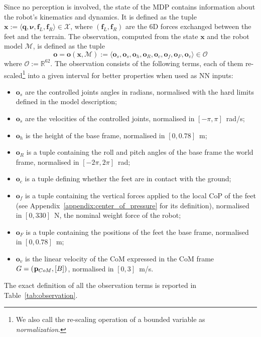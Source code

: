 Since no perception is involved, the state of the \ac{MDP} contains information about the robot's kinematics and dynamics.
It is defined as the tuple $\mathbf{x} := \langle \mathbf{q}, \mathbf{\boldsymbol{\nu}}, \mathbf{f}_L, \mathbf{f}_R \rangle \in \mathcal{X}$, where $(\mathbf{f}_L, \mathbf{f}_R)$ are the 6D forces exchanged between the feet and the terrain.
The observation, computed from the state $\mathbf{x}$ and the robot model $\mathcal{M}$, is defined as the tuple
%
\begin{equation*}
    \boldsymbol{o} =
    \boldsymbol{o}(\mathbf{x}, \mathcal{M}) :=
    \langle \mathbf{o}_s, \mathbf{o}_{\dot{s}}, \mathbf{o}_h, \mathbf{o}_R, \mathbf{o}_c, \mathbf{o}_f, \mathbf{o}_F, \mathbf{o}_v \rangle \in \mathcal{O}
\end{equation*}
%
where $\mathcal{O} := \mathbb{R}^{62}$.
%
The observation consists of the following terms, each of them re-scaled\footnote{We also call the re-scaling operation of a bounded variable as \emph{normalization}.} into a given interval for better properties when used as \ac{NN} inputs:
%
\begin{itemize}
%
\item $\mathbf{o}_s$ are the controlled joints angles in radians, normalised with the hard limits defined in the model description; 
%
\item $\mathbf{o}_{\dot{s}}$ are the velocities of the controlled joints, normalised in $[-\pi, \pi]$~rad/s;
%
\item $\mathbf{o}_h$ is the height of the base frame, normalised in $[0, 0.78]$~m;
%
\item $\mathbf{o}_R$ is a tuple containing the roll and pitch angles of the base frame \wrt the world frame, normalised in $[-2\pi, 2\pi]$~rad;
%
\item $\mathbf{o}_c$ is a tuple defining whether the feet are in contact with the ground;
%
\item $\mathbf{o}_f$ is a tuple containing the vertical forces applied to the local \ac{CoP} of the feet (see Appendix~\ref{appendix:center_of_pressure} for its definition), normalised in $[0, 330]$~N, \ie the nominal weight force of the robot;
%
\item $\mathbf{o}_F$ is a tuple containing the positions of the feet \wrt the base frame, normalised in $[0, 0.78]$~m;
%
\item $\mathbf{o}_v$ is the linear velocity of the \ac{CoM} expressed in the \ac{CoM} frame $G = (\prescript{}{}{\mathbf{p}}_{CoM}, [B])$, normalised in $[0, 3]$~m/s.
%
\end{itemize}
%
The exact definition of all the observation terms is reported in Table~\ref{tab:observation}.

